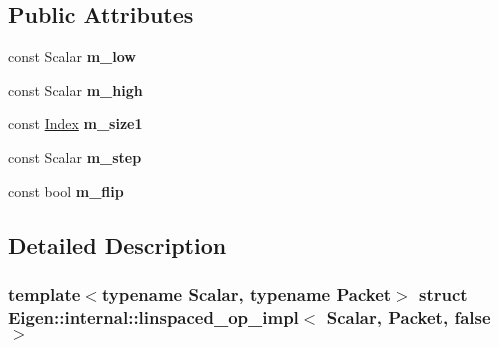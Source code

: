 \subsection*{Public Attributes}
\begin{DoxyCompactItemize}
\item 
\mbox{\label{struct_eigen_1_1internal_1_1linspaced__op__impl_3_01_scalar_00_01_packet_00_01false_01_4_aafac3e238fdf7f360ab3dbb918b4677a}} 
const Scalar {\bfseries m\+\_\+low}
\item 
\mbox{\label{struct_eigen_1_1internal_1_1linspaced__op__impl_3_01_scalar_00_01_packet_00_01false_01_4_a560f63a7288371a1a3ebb5665e75aed4}} 
const Scalar {\bfseries m\+\_\+high}
\item 
\mbox{\label{struct_eigen_1_1internal_1_1linspaced__op__impl_3_01_scalar_00_01_packet_00_01false_01_4_afa389e12b17a1438151e05844012a284}} 
const \hyperlink{namespace_eigen_a62e77e0933482dafde8fe197d9a2cfde}{Index} {\bfseries m\+\_\+size1}
\item 
\mbox{\label{struct_eigen_1_1internal_1_1linspaced__op__impl_3_01_scalar_00_01_packet_00_01false_01_4_abfc4922bd0305b65294c456f52e5c822}} 
const Scalar {\bfseries m\+\_\+step}
\item 
\mbox{\label{struct_eigen_1_1internal_1_1linspaced__op__impl_3_01_scalar_00_01_packet_00_01false_01_4_a422d20eed81476744f4f8ecb28a599ff}} 
const bool {\bfseries m\+\_\+flip}
\end{DoxyCompactItemize}


\subsection{Detailed Description}
\subsubsection*{template$<$typename Scalar, typename Packet$>$\newline
struct Eigen\+::internal\+::linspaced\+\_\+op\+\_\+impl$<$ Scalar, Packet, false $>$}



